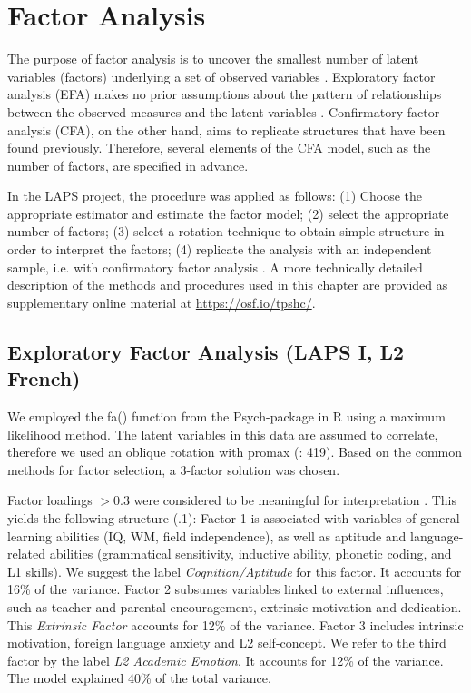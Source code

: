 \documentclass[output=paper]{langsci/langscibook}
\begin{document}
\section{Factor Analysis}

The purpose of factor analysis is to uncover the smallest number of latent variables (factors) underlying a set of observed variables \citep{Brown2006}. Exploratory factor analysis (EFA) makes no prior assumptions about the pattern of relationships between the observed measures and the latent variables \citep{Brown2006}. Confirmatory factor analysis (CFA), on the other hand, aims to replicate structures that have been found previously. Therefore, several elements of the CFA model, such as the number of factors, are specified in advance.

In the LAPS project, the procedure was applied as follows: (1) Choose the appropriate estimator and estimate the factor model; (2) select the appropriate number of factors; (3) select a rotation technique to obtain simple structure in order to interpret the factors; (4) replicate the analysis with an independent sample, i.e. with confirmatory factor analysis \citep{Brown2006}. A more technically detailed description of the methods and procedures used in this chapter are provided as supplementary online material at \url{https://osf.io/tpshc/}.

\subsection{Exploratory Factor Analysis (LAPS I, L2 French)}

We employed the fa() function from the Psych-package in R \citep{Revelle2018} using a maximum likelihood method. The latent variables in this data are assumed to correlate, therefore we used an oblique rotation with promax (\citealt{BortzSchuster2010}: 419). Based on the common methods for factor selection, a 3-factor solution was chosen. 



Factor loadings $> 0.3$ were considered to be meaningful for interpretation \citep[30]{Brown2006}. This yields the following structure (.1): Factor 1 is associated with variables of general learning abilities (IQ, WM, field independence), as well as aptitude and language-related abilities (grammatical sensitivity, inductive ability, phonetic coding, and L1 skills). We suggest the label \textit{Cognition/Aptitude} for this factor. It accounts for 16\% of the variance. Factor 2 subsumes variables linked to external influences, such as teacher and parental encouragement, extrinsic motivation and dedication. This \textit{Extrinsic Factor} accounts for 12\% of the variance. Factor 3 includes intrinsic motivation, foreign language anxiety and L2 self-concept. We refer to the third factor by the label \textit{L2 Academic Emotion}. It accounts for 12\% of the variance. The model explained 40\% of the total variance. 
\end{document}
